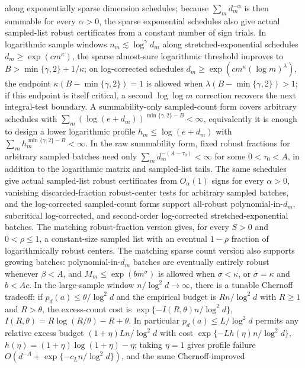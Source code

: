 \documentclass[11pt]{article}
\begin{document}
along exponentially sparse dimension schedules; because \(\sum_m d_m^{-\alpha}\)
is then summable for every \(\alpha>0\), the sparse exponential schedules also
give actual sampled-list robust certificates from a constant number of sign
trials.  In logarithmic sample windows
\(n_m\lesssim\log^\gamma d_m\) along stretched-exponential schedules
\(d_m\ge\exp(c m^\kappa)\), the sparse almost-sure logarithmic threshold
improves to \(B>\min\{\gamma,2\}+1/\kappa\); on log-corrected schedules
\(d_m\ge\exp(c m^\kappa(\log m)^\lambda)\), the endpoint
\(\kappa(B-\min\{\gamma,2\})=1\) is allowed when
\(\lambda(B-\min\{\gamma,2\})>1\); if this endpoint is itself critical, a
second \(\log\log m\) correction recovers the next integral-test boundary.  A
summability-only sampled-count form covers arbitrary schedules with
\(\sum_m(\log(e+d_m))^{\min\{\gamma,2\}-B}<\infty\), equivalently it is enough
to design a lower logarithmic profile \(h_m\le\log(e+d_m)\) with
\(\sum_mh_m^{\min\{\gamma,2\}-B}<\infty\).  In the raw summability form, fixed
robust fractions for arbitrary sampled batches need only
\(\sum_m d_m^{-(A-\tau_0)}<\infty\) for some \(0<\tau_0<A\), in addition to the
logarithmic matrix and sampled-list tails.  The same schedules give actual
sampled-list robust certificates from \(O_\alpha(1)\) signs for every
\(\alpha>0\), vanishing discarded-fraction robust-center tests for arbitrary
sampled batches, and the log-corrected sampled-count forms support all-robust
polynomial-in-\(d_m\), subcritical log-corrected, and second-order log-corrected
stretched-exponential batches.  The matching
robust-fraction version gives, for every \(S>0\)
and \(0<\rho\le1\), a constant-size sampled list with an eventual \(1-\rho\)
fraction of logarithmically robust centers.  The matching sparse count version
also supports growing batches:
polynomial-in-\(d_m\) batches are eventually entirely robust whenever
\(\beta<A\), and \(M_m\le\exp(bm^\sigma)\) is allowed when
\(\sigma<\kappa\), or \(\sigma=\kappa\) and \(b<Ac\).
In the large-sample window
\(n/\log^2 d\to\infty\), there is a
tunable Chernoff tradeoff: if \(p_d(a)\le\theta/\log^2 d\) and the empirical
budget is \(Rn/\log^2 d\) with \(R\ge1\) and \(R>\theta\), the excess-count cost is
\(\exp\{-I(R,\theta)n/\log^2 d\}\), \(I(R,\theta)=R\log(R/\theta)-R+\theta\).
In particular \(p_d(a)\le L/\log^2 d\) permits any relative excess budget
\((1+\eta)Ln/\log^2 d\) with cost
\(\exp\{-Lh(\eta)n/\log^2 d\}\), \(h(\eta)=(1+\eta)\log(1+\eta)-\eta\);
taking \(\eta=1\) gives profile failure
\(O(d^{-A}+\exp\{-c_Ln/\log^2 d\})\), and the same Chernoff-improved
\end{document}
